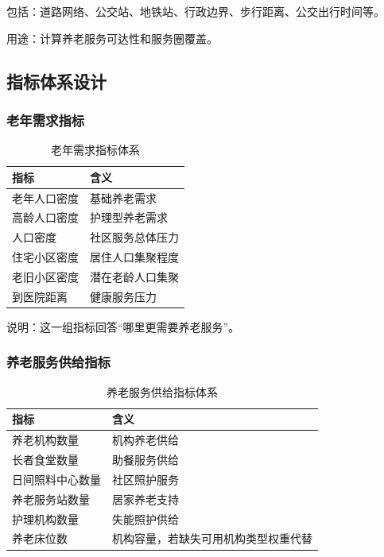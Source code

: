 \documentclass[UTF8,zihao=-4,a4paper,fontset=none]{ctexart}
\begin{document}
包括：道路网络、公交站、地铁站、行政边界、步行距离、公交出行时间等。

用途：计算养老服务可达性和服务圈覆盖。

\subsection{指标体系设计}

\subsubsection{老年需求指标}

\begin{table}[H]
\centering
\caption{老年需求指标体系}
\begin{tabular}{ll}
\toprule
\rowcolor{tablehead}
指标 & 含义 \\
\midrule
老年人口密度 & 基础养老需求 \\
高龄人口密度 & 护理型养老需求 \\
人口密度 & 社区服务总体压力 \\
住宅小区密度 & 居住人口集聚程度 \\
老旧小区密度 & 潜在老龄人口集聚 \\
到医院距离 & 健康服务压力 \\
\bottomrule
\end{tabular}
\end{table}

说明：这一组指标回答“哪里更需要养老服务”。

\subsubsection{养老服务供给指标}

\begin{table}[H]
\centering
\caption{养老服务供给指标体系}
\begin{tabular}{ll}
\toprule
\rowcolor{tablehead}
指标 & 含义 \\
\midrule
养老机构数量 & 机构养老供给 \\
长者食堂数量 & 助餐服务供给 \\
日间照料中心数量 & 社区照护服务 \\
养老服务站数量 & 居家养老支持 \\
护理机构数量 & 失能照护供给 \\
养老床位数 & 机构容量，若缺失可用机构类型权重代替 \\
\bottomrule
\end{tabular}
\end{table}
\end{document}
